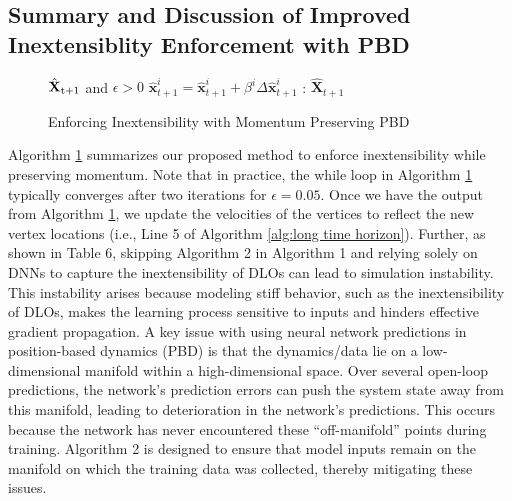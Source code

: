 \subsection{Summary and Discussion of Improved Inextensiblity Enforcement with PBD}
\label{appendix:Inextensibility Enforcement Pseudo Code}
\begin{figure}
\vspace*{-0.85cm}
    \begin{minipage}{0.5\textwidth}
\begin{algorithm}[H]
\caption{Enforcing Inextensibility with Momentum Preserving PBD} 
\label{alg:inextensibility of PBD}
\begin{algorithmic}[1]
\Require $\hat{\textbf{X}}_\text{t+1}$ and $\epsilon > 0$
        \State $\hat{\textbf{x}}_{t+1}^i = \hat{\textbf{x}}_{t+1}^i + \beta^{i}\Delta \hat{\textbf{x}}_{t+1}^i$ \Comment{\eqref{eq:inext1}}
    \EndFor
\EndWhile
\State \Return: $\hat{\textbf{X}}_{t+1}$ 
\end{algorithmic}
\end{algorithm}
\end{minipage}
\vspace*{-14pt}
\end{figure}
Algorithm \ref{alg:inextensibility of PBD} summarizes our proposed method to enforce inextensibility while preserving momentum. 
Note that in practice, the while loop in Algorithm \ref{alg:inextensibility of PBD} typically converges after two iterations for $\epsilon=0.05$.
Once we have the output from Algorithm \ref{alg:inextensibility of PBD}, we update the velocities of the vertices to reflect the new vertex locations (i.e., Line 5 of Algorithm \ref{alg:long time horizon}). 
Further, as shown in Table 6, skipping Algorithm 2 in Algorithm 1 and relying solely on DNNs to capture the inextensibility of DLOs can lead to simulation instability. This instability arises because modeling stiff behavior, such as the inextensibility of DLOs, makes the learning process sensitive to inputs and hinders effective gradient propagation. A key issue with using neural network predictions in position-based dynamics (PBD) is that the dynamics/data lie on a low-dimensional manifold within a high-dimensional space. Over several open-loop predictions, the network's prediction errors can push the system state away from this manifold, leading to deterioration in the network's predictions. This occurs because the network has never encountered these ``off-manifold'' points during training. Algorithm 2 is designed to ensure that model inputs remain on the manifold on which the training data was collected, thereby mitigating these issues.

